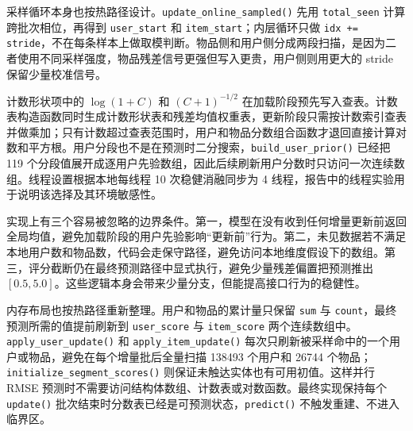 \documentclass[UTF8,zihao=-4,scheme=plain]{ctexart}
\begin{document}
采样循环本身也按热路径设计。\texttt{update\_online\_sampled()} 先用 \texttt{total\_seen} 计算跨批次相位，再得到 \texttt{user\_start} 和 \texttt{item\_start}；内层循环只做 \texttt{idx += stride}，不在每条样本上做取模判断。物品侧和用户侧分成两段扫描，是因为二者使用不同采样强度，物品残差信号更强但写入更贵，用户侧则用更大的 stride 保留少量校准信号。

计数形状项中的 $\log(1+C)$ 和 $(C+1)^{-1/2}$ 在加载阶段预先写入查表。计数表构造函数同时生成计数形状表和残差均值权重表，更新阶段只需按计数索引查表并做乘加；只有计数超过查表范围时，用户和物品分数组合函数才退回直接计算对数和平方根。用户分段也不是在预测时二分搜索，\texttt{build\_user\_prior()} 已经把 119 个分段值展开成逐用户先验数组，因此后续刷新用户分数时只访问一次连续数组。线程设置根据本地每线程 10 次稳健消融同步为 4 线程，报告中的线程实验用于说明该选择及其环境敏感性。

实现上有三个容易被忽略的边界条件。第一，模型在没有收到任何增量更新前返回全局均值，避免加载阶段的用户先验影响“更新前”行为。第二，未见数据若不满足本地用户数和物品数，代码会走保守路径，避免访问本地维度假设下的数组。第三，评分截断仍在最终预测路径中显式执行，避免少量残差偏置把预测推出 $[0.5,5.0]$。这些逻辑本身会带来少量分支，但能提高接口行为的稳健性。

内存布局也按热路径重新整理。用户和物品的累计量只保留 \texttt{sum} 与 \texttt{count}，最终预测所需的值提前刷新到 \texttt{user\_score} 与 \texttt{item\_score} 两个连续数组中。\texttt{apply\_user\_update()} 和 \texttt{apply\_item\_update()} 每次只刷新被采样命中的一个用户或物品，避免在每个增量批后全量扫描 138493 个用户和 26744 个物品；\texttt{initialize\_segment\_scores()} 则保证未触达实体也有可用初值。这样并行 RMSE 预测时不需要访问结构体数组、计数表或对数函数。最终实现保持每个 \texttt{update()} 批次结束时分数表已经是可预测状态，\texttt{predict()} 不触发重建、不进入临界区。
\end{document}
